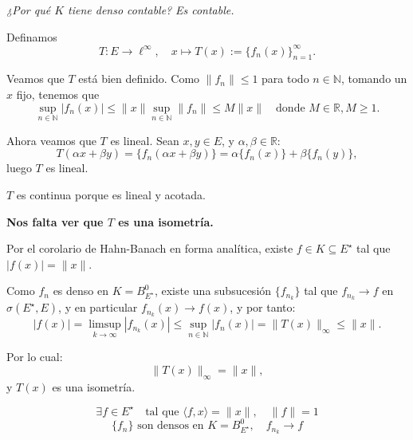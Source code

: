 \begin{itemize}
\textit{\color{red} ¿Por qué $K$ tiene denso contable?} \textit{\color{green} Es contable.}

Definamos
\[
T : E \to \ell^\infty, \quad x \mapsto T(x) := \{ f_n(x) \}_{n=1}^\infty.
\]

Veamos que $T$ está bien definido. Como $\|f_n\| \leq 1$ para todo $n \in \mathbb{N}$, tomando un $x$ fijo, tenemos que
\[
\sup_{n \in \mathbb{N}} |f_n(x)| \leq \|x\| \sup_{n \in \mathbb{N}} \|f_n\| \leq M \|x\| \quad \text{donde } M \in \mathbb{R}, M \geq 1.
\]

Ahora veamos que $T$ es lineal. Sean $x, y \in E$, y $\alpha, \beta \in \mathbb{R}$:
\[
T(\alpha x + \beta y) = \{ f_n(\alpha x + \beta y) \} = \alpha \{ f_n(x) \} + \beta \{ f_n(y) \},
\]
luego $T$ es lineal.

$T$ es continua porque es lineal y acotada.

\bigskip

\textbf{Nos falta ver que $T$ es una isometría.}

Por el corolario de Hahn-Banach en forma analítica, existe $f \in K \subseteq E^{\star}$ tal que $|f(x)| = \|x\|$.

Como $f_n$ es denso en $K = B_{E^{\star}}^0$, existe una subsucesión $\{f_{n_k}\}$ tal que $f_{n_k} \to f$ en $\sigma(E^{\star}, E)$, y en particular $f_{n_k}(x) \to f(x)$, y por tanto:
\[
|f(x)| = \limsup_{k \to \infty} |f_{n_k}(x)| \leq \sup_{n \in \mathbb{N}} |f_n(x)| = \|T(x)\|_\infty \leq \|x\|.
\]

Por lo cual:
\[
\|T(x)\|_\infty = \|x\|,
\]
y $T(x)$ es una isometría.

\bigskip

\[
\exists f \in E^{\star} \quad \text{tal que } \langle f, x \rangle = \|x\|, \quad \|f\| = 1
\]
\[
\{ f_n \} \text{ son densos en } K = B_{E^{\star}}^0, \quad f_{n_k} \to f
\]
 \end{itemize}
 